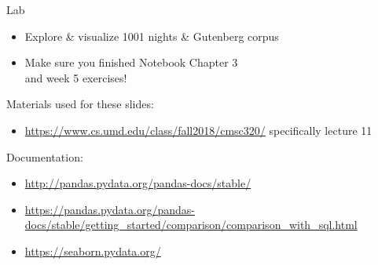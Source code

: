 \documentclass[aspectratio=169,usenames,dvipsnames]{beamer}
\begin{document}

\begin{frame}{Lab}
\begin{itemize}
    \item Explore \& visualize 1001 nights \& Gutenberg corpus
    \item Make sure you finished Notebook Chapter 3 \\
        and week 5 exercises!
\end{itemize}
\end{frame}

\begin{frame}
Materials used for these slides:
\begin{itemize}
\item \url{https://www.cs.umd.edu/class/fall2018/cmsc320/}
    specifically lecture 11
\end{itemize}

\vspace{1em}
Documentation:
\begin{itemize}
    \item \url{http://pandas.pydata.org/pandas-docs/stable/}
    \item \url{https://pandas.pydata.org/pandas-docs/stable/getting_started/comparison/comparison_with_sql.html}
    \item \url{https://seaborn.pydata.org/}
\end{itemize}
\end{frame}
\end{document}
